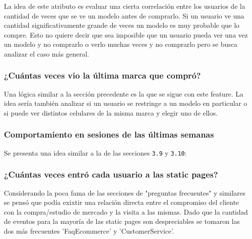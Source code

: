 \documentclass[a4paper]{article}
\begin{document}
La idea de este atributo es evaluar una cierta correlación entre los usuarios de la cantidad de veces que se ve un modelo antes de comprarlo. Si un usuario ve una cantidad significativamente grande de veces un modelo es muy probable que lo compre. Esto no quiere decir que sea imposible que un usuario pueda ver una vez un modelo y no comprarlo o verlo muchas veces y no comprarlo pero se busca analizar el caso más general.

\subsubsection{¿Cuántas veces vio la última marca que compró?}

\begin{sloppypar}
	\texttt{}
\end{sloppypar}

Una lógica similar a la sección precedente es la que se sigue con este feature. La idea sería también analizar si un usuario se restringe a un modelo en particular o si puede ver distintos celulares de la misma marca y elegir uno de ellos.

\subsubsection{Comportamiento en sesiones de las últimas semanas}

\begin{sloppypar}
	\texttt{}
\end{sloppypar}

Se presenta una idea similar a la de las secciones \texttt{3.9} y \texttt{3.10}:

\subsubsection{¿Cuántas veces entró cada usuario a las static pages?}

\begin{sloppypar}
	\texttt{}
\end{sloppypar}

Considerando la poca fama de las secciones de "preguntas frecuentes" y similares se pensó que podía exixtir una relación directa entre el compromiso del cliente con la compra/estudio de mercado y la visita a las mismas. Dado que la cantidad de eventos para la mayoría de las static pages son despreciables se tomaron las dos más frecuentes 'FaqEcommerce' y 'CustomerService'.
\end{document}
